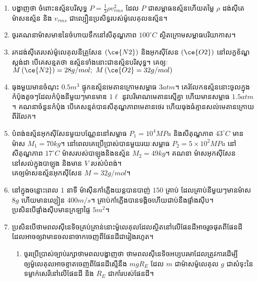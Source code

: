 \begin{enumerate}[m]
\begin{figure}[H]
	\end{figure} 
	\item បង្ហាញថា ចំពោះឧស្ម័នបរិសុទ្ធ $P=\frac{1}{3}\rho v^{2}_{rms}$ ដែល $P$ ជាសម្ពាធឧស្ម័នហើយតម្លៃ $\rho$ ដង់សុីតេម៉ាសឧស្ម័ន និង $v_{rms}$ ជាល្បឿនប្រសិទ្ធរបស់ម៉ូលេគុលឧស្ម័ន។
	\item ចូរគណនាម៉ាសមាឌនៃចំហាយទឹកនៅសីតុណ្ហភាព $100^\circ C$ ស្ថិតក្រោមសម្ពាធបរិយាកាស។
	\item រកដង់សុីតេរបស់ម៉ូលេគុលនីត្រូសែន​ $\left(\ce{N2}\right)$ និងអុកសុីសែន $\left(\ce{O2}\right)$ នៅលក្ខខ័ណ្ឌស្តង់ដា បើគេសន្មតថា ឧស្ម័នទាំងនោះជាឧស្ម័នបរិសុទ្ធ។ គេឲ្យៈ $M\left(\ce{N2}\right)=28g/mol;~M\left(\ce{O2}=32g/mol\right)$
	\item ធុងមួយមានចំណុះ $0.5m^{3}$ ផ្ទុកឧស្ម័នមេតានក្រោមសម្ពាធ $3atm$។ គេរំលែកឧស្ម័ននោះចូលក្នុងកំប៉ុងតូចៗដែលកំប៉ុងនីមួយៗមានមាឌ $1\ell$ នូវបរិមាណមេតានស្មើគ្នា ហើយមានសម្ពាធ $1.5atm$។ គណនាចំនួនកំប៉ុង បើគេសន្មត់បានសីតុណ្ហភាពមេតានថេរ ហើយធុងធំគ្មានសល់មេតានក្រោយពីរំលែក។ 
	\item បំពង់ឧស្ម័នអុកសុីសែនមួយបណ្ណែននៅសម្ពាធ $P_{1}=10^{4}MPa$ និងសីតុណ្ហភាព $43^\circ C$ មានម៉ាស $M_{1}=70kg$។ នៅពេលគេប្រើប្រាស់បានមួយរយៈសម្ពាធ $P_{2}=5\times10^{2}MPa$ នៅសីតុណ្ហភាព $17^\circ C$ ម៉ាសរបស់បាឡុងនិងឧស្ម័ន $M_{2}=49kg$។ គណនា ម៉ាសអុកសុីសែននៅសល់ក្នុងបាឡុង និងមាន $V$ របស់បំពង់។\\ គេឲ្យម៉ាសឧស្ម័នអុកសុីសែន $M=32g/mol$។ 
	\item នៅក្នុងចន្លោះពេល $1$ នាទី ម៉ាសុីនកាំភ្លើងយន្តបានបាញ់ $150$ គ្រាប់ ដែលគ្រាប់នីមួយៗមានម៉ាស $8g$ ហើយមានល្បៀន $400m/s$។ គ្រាប់កាំភ្លើងបានទង្គិចហើយជាប់នឹងផ្ទាំងសុីប។ \\ប្រសិនបើផ្ទាំងសុីបមានក្រឡាផ្ទៃ $5m^{2}$។
	\item ប្រសិនបើថាមពលសុីនេទិចគ្រប់គ្រាន់នោះម៉ូលេគុលដែលស្ថិតនៅលើផែនដីអាចរួចផុតពីផែនដីដែលអាចឲ្យវាមានចលនាចាកចេញពីផែនដីជារៀងរហូត។
	\begin{enumerate}
		\item ចូរប្រើប្រាស់ច្បាប់រក្សាថាមពលបង្ហាញថា ថាមពលសុីនេទិចអប្យបរមាដែលត្រូវការដើម្បីឲ្យម៉ូលេគុលអាចខ្ទាតចេញពីផែនដីស្មើនឹង $mgR_{E}$ ដែល $m$ ជាម៉ាសម៉ូលេគុល $g$ ជាសំទុះនៃទម្លាក់សេរីនៅលើផែនដី និង $R_{E}$ ជាកាំរបស់ផែនដី។

\end{enumerate}
\end{enumerate}
